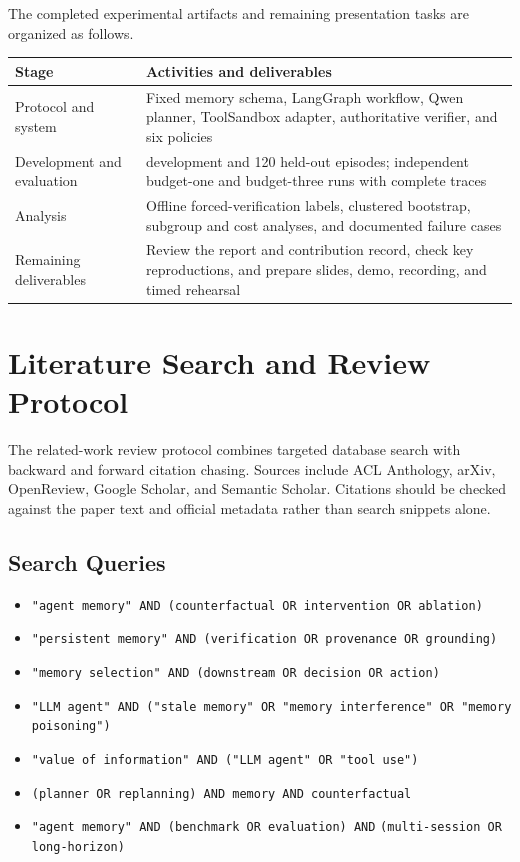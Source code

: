 \documentclass[11pt]{article}
\begin{document}
The completed experimental artifacts and remaining presentation tasks are organized as follows.

\begin{table}[h]
\centering
\small
\begin{tabularx}{\textwidth}{p{}>{\raggedright\arraybackslash}X}
\toprule
\textbf{Stage} & \textbf{Activities and deliverables} \\
\midrule
Protocol and system & Fixed memory schema, LangGraph workflow, Qwen planner, ToolSandbox adapter, authoritative verifier, and six policies \\
Development and evaluation & 40 development and 120 held-out episodes; independent budget-one and budget-three runs with complete traces \\
Analysis & Offline forced-verification labels, clustered bootstrap, subgroup and cost analyses, and documented failure cases \\
Remaining deliverables & Review the report and contribution record, check key reproductions, and prepare slides, demo, recording, and timed rehearsal \\
\bottomrule
\end{tabularx}
\end{table}

\appendix
\section{Literature Search and Review Protocol}
\label{app:literature}

The related-work review protocol combines targeted database search with backward and forward citation chasing. Sources include ACL Anthology, arXiv, OpenReview, Google Scholar, and Semantic Scholar. Citations should be checked against the paper text and official metadata rather than search snippets alone.

\subsection{Search Queries}

\begin{itemize}
  \item \texttt{"agent memory" AND (counterfactual OR intervention OR ablation)}
  \item \texttt{"persistent memory" AND (verification OR provenance OR grounding)}
  \item \texttt{"memory selection" AND (downstream OR decision OR action)}
  \item \texttt{"LLM agent" AND ("stale memory" OR "memory interference"}\allowbreak\ \texttt{OR "memory poisoning")}
  \item \texttt{"value of information" AND ("LLM agent" OR "tool use")}
  \item \texttt{(planner OR replanning) AND memory AND counterfactual}
  \item \texttt{"agent memory" AND (benchmark OR evaluation) AND}\newline
  \hspace*{1em}\texttt{(multi-session OR long-horizon)}
\end{itemize}
\end{document}
